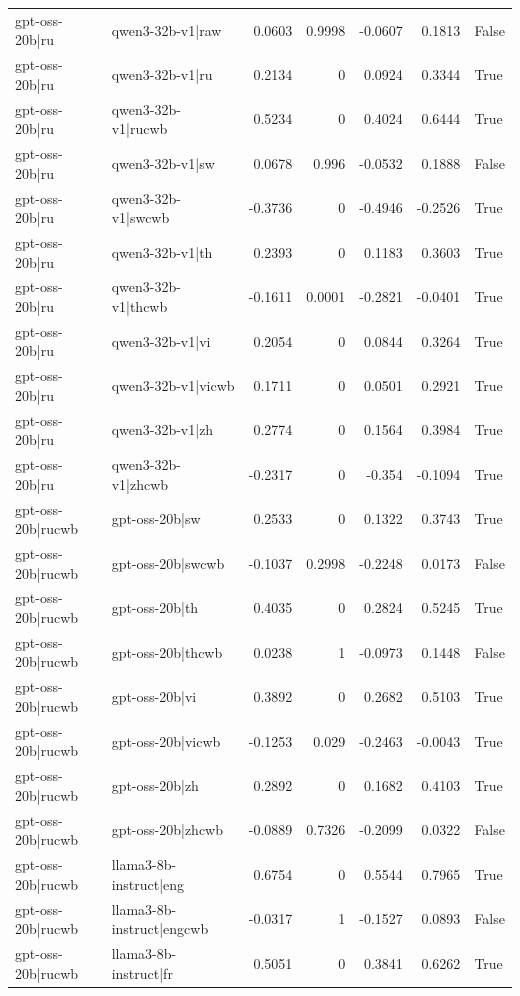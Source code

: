 \begin{table}
\begin{tabular}{l l r r r r l}
gpt-oss-20b|ru & qwen3-32b-v1|raw & 0.0603 & 0.9998 & -0.0607 & 0.1813 & False \\
gpt-oss-20b|ru & qwen3-32b-v1|ru & 0.2134 & 0 & 0.0924 & 0.3344 & True \\
gpt-oss-20b|ru & qwen3-32b-v1|rucwb & 0.5234 & 0 & 0.4024 & 0.6444 & True \\
gpt-oss-20b|ru & qwen3-32b-v1|sw & 0.0678 & 0.996 & -0.0532 & 0.1888 & False \\
gpt-oss-20b|ru & qwen3-32b-v1|swcwb & -0.3736 & 0 & -0.4946 & -0.2526 & True \\
gpt-oss-20b|ru & qwen3-32b-v1|th & 0.2393 & 0 & 0.1183 & 0.3603 & True \\
gpt-oss-20b|ru & qwen3-32b-v1|thcwb & -0.1611 & 0.0001 & -0.2821 & -0.0401 & True \\
gpt-oss-20b|ru & qwen3-32b-v1|vi & 0.2054 & 0 & 0.0844 & 0.3264 & True \\
gpt-oss-20b|ru & qwen3-32b-v1|vicwb & 0.1711 & 0 & 0.0501 & 0.2921 & True \\
gpt-oss-20b|ru & qwen3-32b-v1|zh & 0.2774 & 0 & 0.1564 & 0.3984 & True \\
gpt-oss-20b|ru & qwen3-32b-v1|zhcwb & -0.2317 & 0 & -0.354 & -0.1094 & True \\
gpt-oss-20b|rucwb & gpt-oss-20b|sw & 0.2533 & 0 & 0.1322 & 0.3743 & True \\
gpt-oss-20b|rucwb & gpt-oss-20b|swcwb & -0.1037 & 0.2998 & -0.2248 & 0.0173 & False \\
gpt-oss-20b|rucwb & gpt-oss-20b|th & 0.4035 & 0 & 0.2824 & 0.5245 & True \\
gpt-oss-20b|rucwb & gpt-oss-20b|thcwb & 0.0238 & 1 & -0.0973 & 0.1448 & False \\
gpt-oss-20b|rucwb & gpt-oss-20b|vi & 0.3892 & 0 & 0.2682 & 0.5103 & True \\
gpt-oss-20b|rucwb & gpt-oss-20b|vicwb & -0.1253 & 0.029 & -0.2463 & -0.0043 & True \\
gpt-oss-20b|rucwb & gpt-oss-20b|zh & 0.2892 & 0 & 0.1682 & 0.4103 & True \\
gpt-oss-20b|rucwb & gpt-oss-20b|zhcwb & -0.0889 & 0.7326 & -0.2099 & 0.0322 & False \\
gpt-oss-20b|rucwb & llama3-8b-instruct|eng & 0.6754 & 0 & 0.5544 & 0.7965 & True \\
gpt-oss-20b|rucwb & llama3-8b-instruct|engcwb & -0.0317 & 1 & -0.1527 & 0.0893 & False \\
gpt-oss-20b|rucwb & llama3-8b-instruct|fr & 0.5051 & 0 & 0.3841 & 0.6262 & True \\

\end{tabular}
\end{table}
